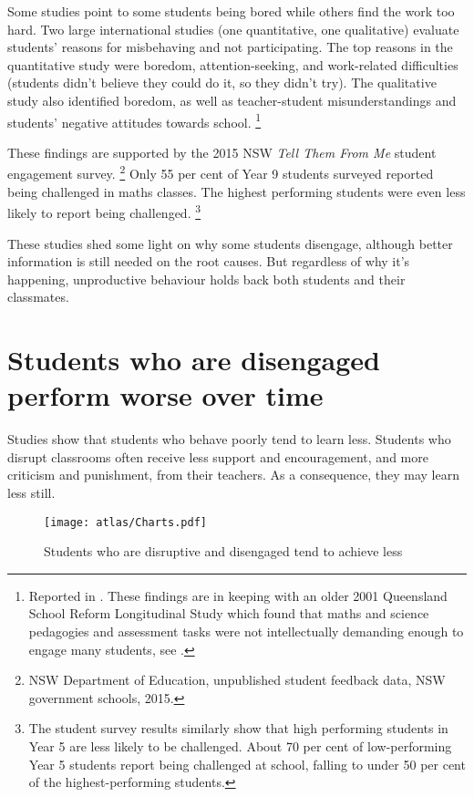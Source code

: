 \documentclass[FrontPage]{grattan}
\begin{document}
Some studies point to some students being bored while others find the work too hard. Two large international studies (one quantitative, one qualitative) evaluate students' reasons for misbehaving and not participating. The top reasons in the quantitative study were boredom, attention-seeking, and work-related difficulties (students didn't believe they could do it, so they didn't try). The qualitative study also identified boredom, as well as teacher-student misunderstandings and students' negative attitudes towards school.%
    \footnote{Reported in \textcite{Montuoro2015StudentPerceptionsMisbehaviour}.
    These findings are in keeping with an older 2001 Queensland School Reform Longitudinal Study which found that maths and science pedagogies and assessment tasks were not intellectually demanding enough to engage many students, see \textcite{Lingard2001QueenslandSchoolReformFinalReport}.} 
 
These findings are supported by the 2015 NSW \emph{Tell Them From Me} student engagement survey.%
    \footnote{NSW Department of Education, unpublished student feedback data, NSW government schools, 2015.}
Only 55 per cent of Year 9 students surveyed reported being challenged in maths classes. The highest performing students were even less likely to report being challenged.%
    \footnote{The student survey results similarly show that high performing students in Year 5 are less likely to be challenged. About 70 per cent of low-performing Year 5 students report being challenged at school, falling to under 50 per cent of the highest-performing students.} %
 
These studies shed some light on why some students disengage, although better information is still needed on the root causes. But  regardless of why it's happening, unproductive behaviour holds back both students and their classmates.

\section{Students who are disengaged perform worse over time}\label{sec:students-not-engaged-perform-worse}
Studies show that students who behave poorly tend to learn less. Students who disrupt classrooms often receive less support and encouragement, and more criticism and punishment, from their teachers. As a consequence, they may learn less still.

\begin{figure}
\caption{Students who are disruptive and disengaged tend to achieve less\label{fig:lower-scores-on-average}}%
\texttt{[image: atlas/Charts.pdf]}
%
{\textcite{Angus2009PipelineProject}}
\end{figure}
\end{document}

